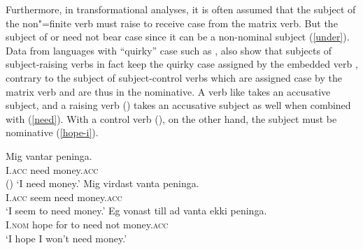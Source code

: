 \eal
{}
\zl

Furthermore, in transformational analyses, it is often assumed that the subject of the non"=finite verb must raise to receive case from the matrix verb.
 But the subject of  or  need not bear case  since it can be a non-nominal subject (\ref{under}).
Data from languages with ``quirky'' case such as , also show that subjects of
subject-raising verbs in fact keep the quirky case assigned by the embedded verb
\citep{Zaenenetal1985}\addpages, contrary to the subject of subject-control verbs which are assigned
case by the matrix verb and are thus in the nominative. A verb like  takes an accusative
subject, and a raising verb () takes an accusative subject as well when combined with
 (\ref{need}). With a control verb (), on the other hand, the subject must be
nominative (\ref{hope-i}). 

\eal
\ex 
\gll Mig vantar peninga.\\
     I.\textsc{acc} need money.\textsc{acc} \\\hfill()
     \glt `I need money.'
\ex 
\gll Mig virdast vanta peninga. \label{need} \\
     I.\textsc{acc} seem need money.\textsc{acc} \\
\glt `I seem to need money.'
\ex 
\gll Eg vonast till ad vanta ekki peninga. \label{hope-i} \\
     I.\textsc{nom} hope for to need not money.\textsc{acc} \\
\glt `I hope I won't need money.'
\zl


